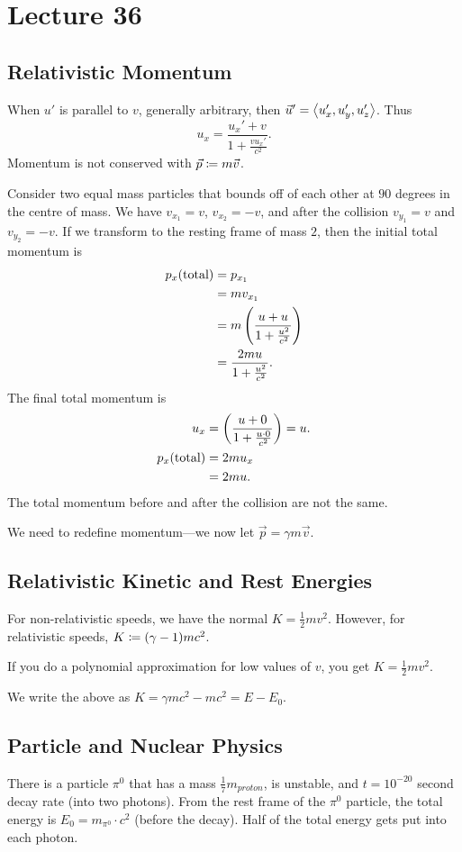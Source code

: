 \documentclass[class=article, crop=false]{standalone}
\begin{document}
  \section{Lecture 36}
  \subsection{Relativistic Momentum}
  When $u'$ is parallel to $v$, generally arbitrary, then $\vec{u}' = \left\langle u_x', u_y', u_z' \right\rangle$. Thus 
  \[
    u_x = \frac{u_x' + v}{1 + \frac{vu_x'}{c^2}}.
  \]
  Momentum is not conserved with $\vec{p}\coloneqq m\vec{v}$.
  \begin{example}{}
    Consider two equal mass particles that bounds off of each other at $90$ degrees in the centre of mass. We have $v_{x_1} = v$, $v_{x_2} = -v$, and after the collision $v_{y_1} = v$ and $v_{y_2} = -v$. If we transform to the resting frame of mass $2$, then the initial total momentum is
    \begin{align*}
      p_x(\text{total}) &= p_{x_1} \\
                        &= mv_{x_1} \\
                        &= m\left( \frac{u + u}{1 + \frac{u^2}{c^2}} \right) \\
                        &= \frac{2mu}{1 + \frac{u^2}{c^2}}.
    \end{align*}
    The final total momentum is
    \begin{align*}
      u_x &= \left( \frac{u + 0}{1 + \frac{u\cdot 0}{c^2}} \right) = u. \\
      p_x(\text{total}) &= 2mu_x \\
                        &= 2mu.
    \end{align*}
    The total momentum before and after the collision are not the same.
  \end{example}
  We need to redefine momentum---we now let $\vec{p} = \gamma m\vec{v}$.
  \subsection{Relativistic Kinetic and Rest Energies}
  For non-relativistic speeds, we have the normal $K = \frac{1}{2}mv^2$. However, for relativistic speeds, $K\coloneqq (\gamma - 1)mc^2$.
  \begin{note}{}
    If you do a polynomial approximation for low values of $v$, you get $K = \frac{1}{2}mv^2$.
  \end{note}
  We write the above as $K = \gamma mc^2 - mc^2 = E - E_0$.
  \subsection{Particle and Nuclear Physics}
  There is a particle $\pi^0$ that has a mass $\frac{1}{7}m_{proton}$, is unstable, and $t = 10^{-20}$ second decay rate (into two photons). From the rest frame of the $\pi^0$ particle, the total energy is $E_0 = m_{\pi^0}\cdot c^2$ (before the decay). Half of the total energy gets put into each photon.
\end{document}
